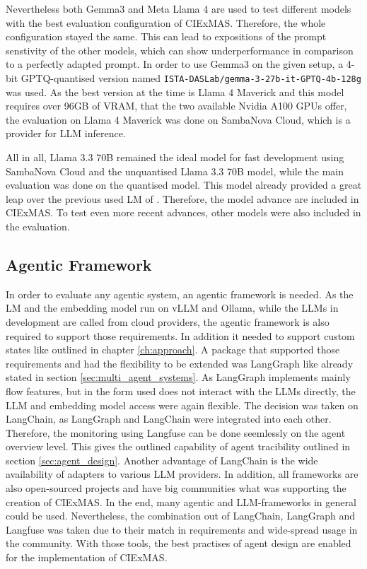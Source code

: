 \documentclass[a4paper,oneside,bibliography=totoc]{scrbook}
\begin{document}
Nevertheless both Gemma3 and Meta Llama 4 are used to test different models with the best evaluation configuration of CIExMAS. Therefore, the whole configuration stayed the same. This can lead to expositions of the prompt senstivity of the other models, which can show underperformance in comparison to a perfectly adapted prompt. In order to use Gemma3 on the given setup, a 4-bit GPTQ-quantised version named \texttt{ISTA-DASLab/gemma-3-27b-it-GPTQ-4b-128g} was used. As the best version at the time is Llama 4 Maverick and this model requires over 96GB of VRAM, that the two available Nvidia A100 GPUs offer, the evaluation on Llama 4 Maverick was done on SambaNova Cloud, which is a provider for LLM inference.

All in all, Llama 3.3 70B remained the ideal model for fast development using SambaNova Cloud and the unquantised Llama 3.3 70B model, while the main evaluation was done on the quantised model. This model already provided a great leap over the previous used \ac{LM} of \citet{Josifoski2023}. Therefore, the model advance are included in CIExMAS. To test even more recent advances, other models were also included in the evaluation.

\subsection{Agentic Framework}
\label{subsec:agentic_framework}
In order to evaluate any agentic system, an agentic framework is needed. As the \ac{LM} and the embedding model run on vLLM and Ollama, while the \acp{LLM} in development are called from cloud providers, the agentic framework is also required to support those requirements. In addition it needed to support custom states like outlined in chapter \ref{ch:approach}.
A package that supported those requirements and had the flexibility to be extended was LangGraph like already stated in section \ref{sec:multi_agent_systems}. As LangGraph implements mainly flow features, but in the form used does not interact with the \acp{LLM} directly, the \ac{LLM} and embedding model access were again flexible. The decision was taken on LangChain, as LangGraph and LangChain were integrated into each other. Therefore, the monitoring using Langfuse can be done seemlessly on the agent overview level. This gives the outlined capability of agent tracibility outlined in section \ref{sec:agent_design}. Another advantage of LangChain is the wide availability of adapters to various LLM providers. In addition, all frameworks are also open-sourced projects and have big communities what was supporting the creation of CIExMAS.
In the end, many agentic and \ac{LLM}-frameworks in general could be used. Nevertheless, the combination out of LangChain, LangGraph and Langfuse was taken due to their match in requirements and wide-spread usage in the community. With those tools, the best practises of agent design are enabled for the implementation of CIExMAS.
\end{document}
